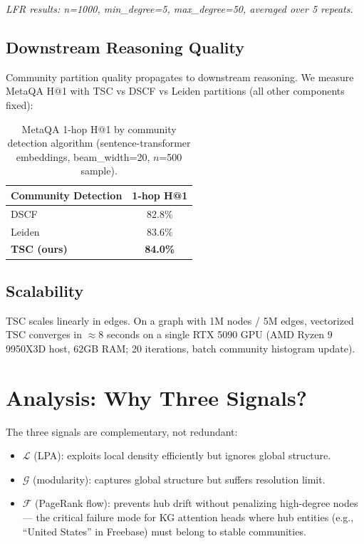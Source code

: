 \documentclass[10pt,twocolumn]{article}
\begin{document}
\noindent\emph{LFR results: n=1000, min\_degree=5, max\_degree=50, averaged over 5 repeats.}

\subsection{Downstream Reasoning Quality}

Community partition quality propagates to downstream reasoning. We measure MetaQA H@1
with TSC vs DSCF vs Leiden partitions (all other components fixed):

\begin{table}[h]
\small\centering
\caption{MetaQA 1-hop H@1 by community detection algorithm (sentence-transformer embeddings, beam\_width=20, $n$=500 sample).}
\label{tab:downstream}
\begin{tabular}{lc}
\toprule
\textbf{Community Detection} & \textbf{1-hop H@1} \\
\midrule
DSCF                 & 82.8\% \\
Leiden               & 83.6\% \\
\textbf{TSC (ours)}  & \textbf{84.0\%} \\
\bottomrule
\end{tabular}
\end{table}

\subsection{Scalability}

TSC scales linearly in edges. On a graph with 1M nodes / 5M edges,
vectorized TSC converges in $\approx$8 seconds on a single RTX 5090 GPU
(AMD Ryzen 9 9950X3D host, 62GB RAM; 20 iterations, batch community histogram update).

\section{Analysis: Why Three Signals?}

The three signals are complementary, not redundant:

\begin{itemize}
  \item $\mathcal{L}$ (LPA): exploits local density efficiently but ignores global structure.
  \item $\mathcal{G}$ (modularity): captures global structure but suffers resolution limit.
  \item $\mathcal{F}$ (PageRank flow): prevents hub drift without penalizing high-degree
        nodes — the critical failure mode for KG attention heads where hub entities
        (e.g., ``United States'' in Freebase) must belong to stable communities.
\end{itemize}
\end{document}
